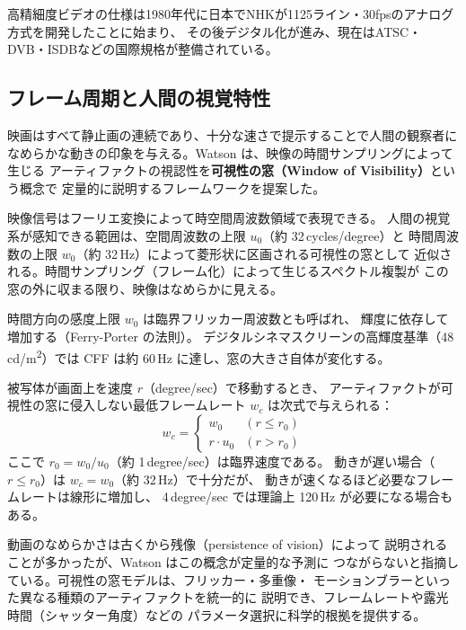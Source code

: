 \documentclass[12pt,a4paper]{ltjsarticle}
\begin{document}
  高精細度ビデオの仕様は1980年代に日本でNHKが1125ライン・30fpsのアナログ方式を開発したことに始まり、
  その後デジタル化が進み、現在はATSC・DVB・ISDBなどの国際規格が整備されている\cite{wikipedia_hd}。

  \subsection{フレーム周期と人間の視覚特性}\label{subsec:research2}

  映画はすべて静止画の連続であり、十分な速さで提示することで人間の観察者に
  なめらかな動きの印象を与える。Watson は、映像の時間サンプリングによって生じる
  アーティファクトの視認性を\textbf{可視性の窓（Window of Visibility）}という概念で
  定量的に説明するフレームワークを提案した\cite{watson2013}。

  \begin{description}[style=nextline, leftmargin=2em, topsep=6pt]
  \vspace{4pt}
    \item[時空間周波数と可視性の窓]
      映像信号はフーリエ変換によって時空間周波数領域で表現できる。
      人間の視覚系が感知できる範囲は、空間周波数の上限 $u_0$（約 32\,cycles/degree）と
      時間周波数の上限 $w_0$（約 32\,Hz）によって菱形状に区画される可視性の窓として
      近似される。時間サンプリング（フレーム化）によって生じるスペクトル複製が
      この窓の外に収まる限り、映像はなめらかに見える。
  \vspace{4pt}
    \item[臨界フリッカー周波数（CFF）と輝度]
      時間方向の感度上限 $w_0$ は臨界フリッカー周波数とも呼ばれ、
      輝度に依存して増加する（Ferry-Porter の法則）。
      デジタルシネマスクリーンの高輝度基準（48\,cd/m\textsuperscript{2}）では
      CFF は約 60\,Hz に達し、窓の大きさ自体が変化する。
  \vspace{4pt}
    \item[臨界フレームレートと運動速度]
      被写体が画面上を速度 $r$（degree/sec）で移動するとき、
      アーティファクトが可視性の窓に侵入しない最低フレームレート $w_c$ は次式で与えられる：
      \begin{equation}
        w_c =
        \begin{cases}
          w_0       & (r \leq r_0) \\
          r \cdot u_0 & (r > r_0)
        \end{cases}
      \end{equation}
      ここで $r_0 = w_0/u_0$（約 1\,degree/sec）は臨界速度である。
      動きが遅い場合（$r \leq r_0$）は $w_c = w_0$（約 32\,Hz）で十分だが、
      動きが速くなるほど必要なフレームレートは線形に増加し、
      4\,degree/sec では理論上 120\,Hz が必要になる場合もある。
  \vspace{4pt}
    \item[残像との違い]
      動画のなめらかさは古くから残像（persistence of vision）によって
      説明されることが多かったが、Watson はこの概念が定量的な予測に
      つながらないと指摘している。可視性の窓モデルは、フリッカー・多重像・
      モーションブラーといった異なる種類のアーティファクトを統一的に
      説明でき、フレームレートや露光時間（シャッター角度）などの
      パラメータ選択に科学的根拠を提供する。
  \end{description}
\end{document}
